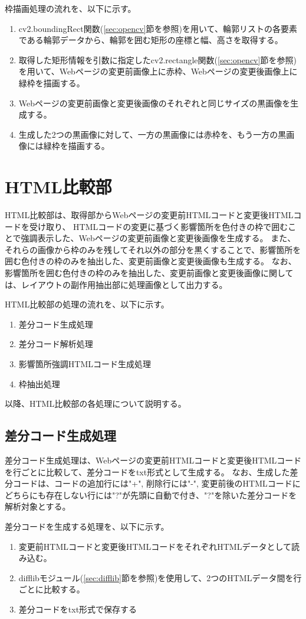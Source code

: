 \par
枠描画処理の流れを、以下に示す。
\begin{enumerate}
    \item cv2.boundingRect関数(\ref{sec:opencv}節を参照)を用いて、輪郭リストの各要素である輪郭データから、輪郭を囲む矩形の座標と幅、高さを取得する。
    \item 取得した矩形情報を引数に指定したcv2.rectangle関数(\ref{sec:opencv}節を参照)を用いて、Webページの変更前画像上に赤枠、Webページの変更後画像上に緑枠を描画する。
    \item Webページの変更前画像と変更後画像のそれぞれと同じサイズの黒画像を生成する。
    \item 生成した2つの黒画像に対して、一方の黒画像には赤枠を、もう一方の黒画像には緑枠を描画する。
\end{enumerate}


\section{HTML比較部}\label{sec:Affected_area_extraction}
HTML比較部は、取得部からWebページの変更前HTMLコードと変更後HTMLコードを受け取り、
HTMLコードの変更に基づく影響箇所を色付きの枠で囲むことで強調表示した、Webページの変更前画像と変更後画像を生成する。
また、それらの画像から枠のみを残してそれ以外の部分を黒くすることで、影響箇所を囲む色付きの枠のみを抽出した、変更前画像と変更後画像も生成する。
なお、影響箇所を囲む色付きの枠のみを抽出した、変更前画像と変更後画像に関しては、レイアウトの副作用抽出部に処理画像として出力する。
\par
HTML比較部の処理の流れを、以下に示す。
\begin{enumerate}
    \item 差分コード生成処理
    \item 差分コード解析処理
    \item 影響箇所強調HTMLコード生成処理
    \item 枠抽出処理
\end{enumerate}
以降、HTML比較部の各処理について説明する。

\subsection{差分コード生成処理}\label{subsec:diff_file_generate}
差分コード生成処理は、Webページの変更前HTMLコードと変更後HTMLコードを行ごとに比較して、差分コードをtxt形式として生成する。
なお、生成した差分コードは、コードの追加行には"+", 削除行には"-", 変更前後のHTMLコードにどちらにも存在しない行には"?"が先頭に自動で付き、"?"を除いた差分コードを解析対象とする。
\par
差分コードを生成する処理を、以下に示す。
\begin{enumerate}
    \item 変更前HTMLコードと変更後HTMLコードをそれぞれHTMLデータとして読み込む。
    \item difflibモジュール(\ref{sec:difflib}節を参照)を使用して、2つのHTMLデータ間を行ごとに比較する。
    \item 差分コードをtxt形式で保存する
\end{enumerate}

